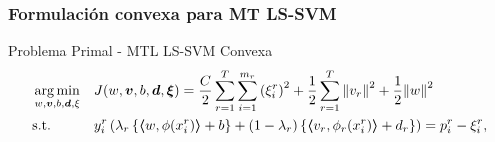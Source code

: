 \documentclass{beamer}
\DeclareMathOperator*{\argmin}{arg\min}
\newcommand{\norm}[1]{\left\lVert#1\right\rVert}
\newcommand{\myvec}[1]{\bm{#1}}
\newcommand{\fv}[1]{\myvec{#1}}
\newcommand{\dotp}[2]{\bm{\left\langle} #1, #2 \bm{\right\rangle}}
\begin{document}
  \begin{frame}
      \frametitle{Formulación convexa para MT LS-SVM}

      \begin{block}{Problema Primal - MTL LS-SVM Convexa}
            \begin{equation}\nonumber
                  \begin{aligned}
                  & \argmin_{w, \fv{v}, b, \fv{d}, \xi}
                  & & {J({w}, \fv{v}, b, \fv{d}, \fv{\xi}) = \frac{C}{2} \sum_{r= 1}^T \sum_{i=1}^{m_r} \left({\xi_{i}^r}\right)^2 + \frac{1}{2} \sum_{r= 1}^T{\norm{{v}_r}^2} + \frac{1}{2} {\norm{{w}}}^2} \\
                  & \text{s.t.}
                  & & y_{i}^r \left(\lambda_r \left\lbrace \dotp{w}{\phi(x_{i}^r)} + b  \right\rbrace + (1 - \lambda_r) \left\lbrace \dotp{{v}_r}{\phi_r(x_{i}^r)} + d_r \right\rbrace  \right) = p_{i}^r - \xi_{i}^r ,  \\
                  \end{aligned}
              \end{equation}
      \end{block}

\end{frame}
\end{document}
